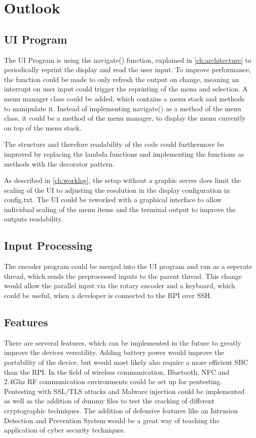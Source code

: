 \chapter{Outlook}\label{ch:outlook}
\section{UI Program}
The UI Program is using the navigate() function, explained in \ref{ch:architecture} to periodically reprint the display and read the user input.
To improve performance, the function could be made to only refresh the output on change, meaning an interrupt on user input could trigger the reprinting of the menu and selection.
A menu manager class could be added, which contains a menu stack and methods to manipulate it.
Instead of implementing navigate() as a method of the menu class, it could be a method of the menu manager, to display the menu currently on top of the menu stack.

The structure and therefore readability of the code could furthermore be improved by replacing the lambda functions and implementing the functions as methods with the decorator pattern.

As described in \ref{ch:worklog}, the setup without a graphic server does limit the scaling of the UI to adjusting the resolution in the display configuration in config.txt.
The UI could be reworked with a graphical interface to allow individual scaling of the menu items and the terminal output to improve the outputs readability.


\section{Input Processing}
The encoder program could be merged into the UI program and run as a seperate thread, which sends the preprocessed inputs to the parent thread.
This change would allow the parallel input via the rotary encoder and a keyboard, which could be useful, when a developer is connected to the RPI over SSH.

\section{Features}
There are serveral features, which can be implemented in the future to greatly improve the devices versatility.
Adding battery power would improve the portability of the device, but would most likely also require a more efficient SBC than the RPI.
In the field of wireless communication, Bluetooth, NFC and 2.4Ghz RF communication environments could be set up for pentesting.
Pentesting with SSL/TLS attacks and Malware injection could be implemented as well as the addition of dummy files to test the cracking of different cryptographic techniques.
The addition of defensive features like an Intrusion Detection and Prevention System would be a great way of teaching the application of cyber security techniques. 
